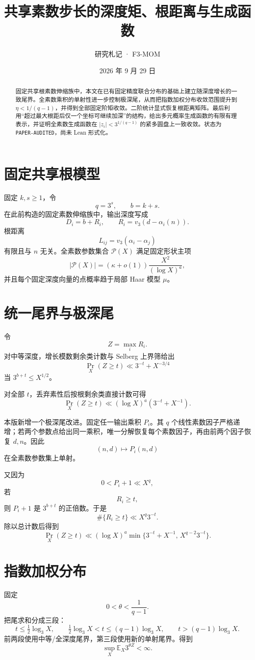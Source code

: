 \documentclass[11pt,a4paper]{ctexart}
\title{\bfseries 共享素数步长的深度矩、根距离与生成函数}
\author{研究札记 · F3-MOM}
\date{2026 年 9 月 29 日}
\begin{document}
\maketitle
\begin{abstract}
固定共享根素数伸缩族中，本文在已有固定精度联合分布的基础上建立随深度增长的一致尾界。全素数乘积的单射性进一步控制极深尾，从而把指数加权分布收敛范围提升到 \(\eta<1/(q-1)\)，并得到全部固定阶矩收敛。二阶统计显式恢复根距离矩阵。最后利用“超过最大根距后仅一个坐标可继续加深”的结构，给出多元概率生成函数的有限有理表示，并证明全素数生成函数在 \(|z_i|<3^{1/(q-1)}\) 的紧多圆盘上一致收敛。状态为 \texttt{PAPER-AUDITED}，尚未 Lean 形式化。
\end{abstract}

\section{固定共享根模型}
固定 \(k,s\ge1\)，令
\[
q=3^s,\qquad b=k+s.
\]
在此前构造的固定素数伸缩族中，输出深度写成
\[
D_i=b+R_i,\qquad
R_i=v_3(d-\alpha_i(n)).
\]
根距离
\[
L_{ij}=v_3(\alpha_i-\alpha_j)
\]
有限且与 \(n\) 无关。全素数参数集合 \(\mathcal P(X)\) 满足固定形状主项
\[
|\mathcal P(X)|
=
(\kappa+o(1))
\frac{X^2}{(\log X)^a},
\]
并且每个固定深度向量的点概率趋于局部 Haar 模型 \(\mu\)。

\section{统一尾界与极深尾}
令
\[
Z=\max_iR_i.
\]
对中等深度，增长模数剩余类计数与 Selberg 上界筛给出
\[
\Pr_X(Z\ge t)
\ll
3^{-t}+X^{-3/4}
\]
当 \(3^{b+t}\le X^{1/2}\)。

对全部 \(t\)，丢弃素性后按根剩余类直接计数可得
\[
\Pr_X(Z\ge t)
\ll
(\log X)^a(3^{-t}+X^{-1}).
\]

本版新增一个极深尾改进。固定任一输出乘积 \(P_i\)。其 \(q\) 个线性素数因子严格递增；若两个参数点给出同一乘积，唯一分解恢复每个素数因子，再由前两个因子恢复 \(d,n\)。因此
\[
(n,d)\longmapsto P_i(n,d)
\]
在全素数参数集上单射。

又因为
\[
0<P_i+1\ll X^q,
\]
若
\[
R_i\ge t,
\]
则 \(P_i+1\) 是 \(3^{b+t}\) 的正倍数。于是
\[
\#\{R_i\ge t\}\ll X^q3^{-t}.
\]
除以总计数后得到
\[
\boxed{
\Pr_X(Z\ge t)
\ll
(\log X)^a
\min\{3^{-t}+X^{-1},\,X^{q-2}3^{-t}\}.
}
\]

\section{指数加权分布}
固定
\[
0<\theta<\frac1{q-1}.
\]
把尾求和分成三段：
\[
t\le \tfrac12\log_3X,
\qquad
\tfrac12\log_3X<t\le(q-1)\log_3X,
\qquad
t>(q-1)\log_3X.
\]
前两段使用中等/全深度尾界，第三段使用新的单射尾界。得到
\[
\sup_X\mathbb E_X3^{\theta Z}<\infty.
\]
\end{document}
